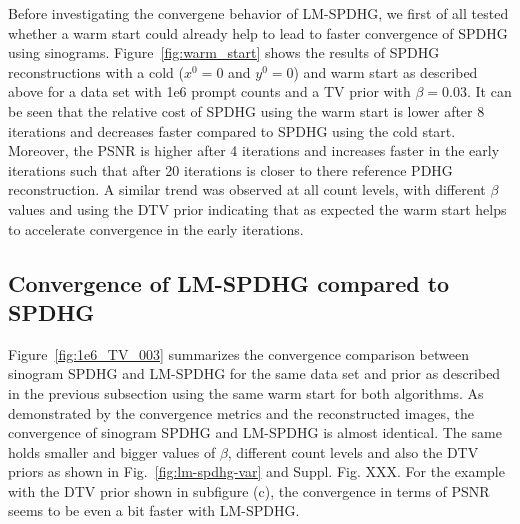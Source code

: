 Before investigating the convergene behavior of LM-SPDHG, we first of all tested whether 
a warm start could already help to lead to faster convergence of SPDHG using sinograms.
Figure~\ref{fig:warm_start} shows the results of SPDHG reconstructions with a cold 
($x^0 = 0$ and $y^0 = 0$) and warm start as described above for a data set with 1e6 prompt counts
and a TV prior with $\beta = 0.03$.
It can be seen that the relative cost of SPDHG using the warm start is lower after 8 iterations
and decreases faster compared to SPDHG using the cold start.
Moreover, the PSNR is higher after 4 iterations and increases faster in the early iterations such
that after 20 iterations is closer to there reference PDHG reconstruction.
A similar trend was observed at all count levels, with different $\beta$ values and using
the DTV prior indicating that as expected the warm start helps to accelerate convergence
in the early iterations.
\subsection*{Convergence of LM-SPDHG compared to SPDHG}

Figure~\ref{fig:1e6_TV_003} summarizes the convergence comparison between sinogram SPDHG and LM-SPDHG for
the same data set and prior as described in the previous subsection using the same warm start
for both algorithms.
As demonstrated by the convergence metrics and the reconstructed images, the convergence of
sinogram SPDHG and LM-SPDHG is almost identical.
The same holds smaller and bigger values of $\beta$, different count levels and also the
DTV priors as shown in Fig.~\ref{fig:lm-spdhg-var} and Suppl. Fig. XXX.
For the example with the DTV prior shown in subfigure (c), the convergence in terms of
PSNR seems to be even a bit faster with LM-SPDHG.

